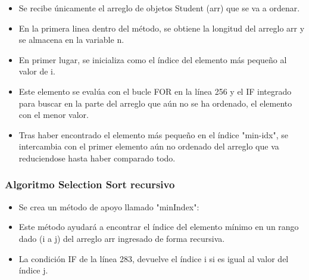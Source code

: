 \documentclass{article}
\begin{document}
        \begin{itemize}	
            \item Se recibe únicamente el arreglo de objetos Student (arr) que se va a ordenar.
            \item En la primera linea dentro del método, se obtiene la longitud del arreglo arr y se almacena en la variable n.
            \item En primer lugar, se inicializa como el índice del elemento más pequeño al valor de i.
            \item Este elemento se evalúa con el bucle FOR en la línea 256 y el IF integrado  para buscar en la parte del arreglo que aún no se ha ordenado, el elemento con el menor valor. 
            \item Tras haber encontrado el elemento más pequeño en el índice "min-idx", se intercambia con el primer elemento aún no ordenado del arreglo que va reduciendose hasta haber comparado todo.  
        \end{itemize}

        \subsubsection{Algoritmo Selection Sort recursivo}

        \begin{itemize}	
            \item Se crea un método de apoyo llamado "minIndex":
        \end{itemize}
        
        
     
        \begin{itemize}	
            \item Este método ayudará a encontrar el índice del elemento mínimo en un rango dado (i a j) del arreglo arr ingresado de forma recursiva.
            \item La condición IF de la línea 283, devuelve el índice i si es igual al valor del índice j.

        \end{itemize}

        
\end{document}
